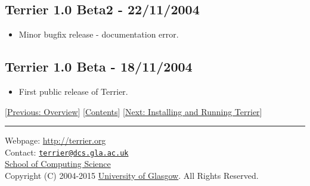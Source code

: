 \subsection{Terrier 1.0 Beta2 -
22/11/2004}\label{terrier-1.0-beta2---22112004}

\begin{itemize}
\tightlist
\item
  Minor bugfix release - documentation error.
\end{itemize}

\subsection{Terrier 1.0 Beta -
18/11/2004}\label{terrier-1.0-beta---18112004}

\begin{itemize}
\tightlist
\item
  First public release of Terrier.
\end{itemize}

{[}\href{overview.html}{Previous: Overview}{]}
{[}\href{index.html}{Contents}{]} {[}\href{quickstart.html}{Next:
Installing and Running Terrier}{]}

\begin{center}\rule{0.5\linewidth}{\linethickness}\end{center}

Webpage: \url{http://terrier.org}\\
Contact:
\href{mailto:terrier@dcs.gla.ac.uk}{\nolinkurl{terrier@dcs.gla.ac.uk}}\\
\href{http://www.dcs.gla.ac.uk/}{School of Computing Science}\\
Copyright (C) 2004-2015 \href{http://www.gla.ac.uk/}{University of
Glasgow}. All Rights Reserved.

